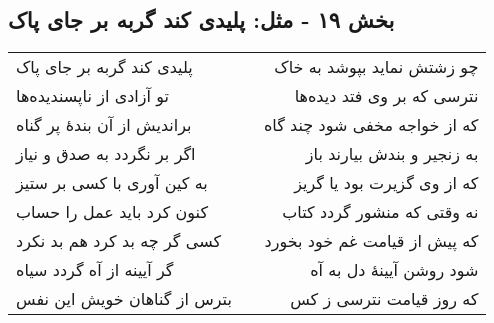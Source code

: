 \begin{center}
\section*{بخش ۱۹ - مثل: پلیدی کند گربه بر جای پاک}
\label{sec:019}
\begin{longtable}{l p{0.5cm} r}
پلیدی کند گربه بر جای پاک
&&
چو زشتش نماید بپوشد به خاک
\\
تو آزادی از ناپسندیده‌ها
&&
نترسی که بر وی فتد دیده‌ها
\\
براندیش از آن بندهٔ پر گناه
&&
که از خواجه مخفی شود چند گاه
\\
اگر بر نگردد به صدق و نیاز
&&
به زنجیر و بندش بیارند باز
\\
به کین آوری با کسی بر ستیز
&&
که از وی گزیرت بود یا گریز
\\
کنون کرد باید عمل را حساب
&&
نه وقتی که منشور گردد کتاب
\\
کسی گر چه بد کرد هم بد نکرد
&&
که پیش از قیامت غم خود بخورد
\\
گر آیینه از آه گردد سیاه
&&
شود روشن آیینهٔ دل به آه
\\
بترس از گناهان خویش این نفس
&&
که روز قیامت نترسی ز کس
\\
\end{longtable}
\end{center}
